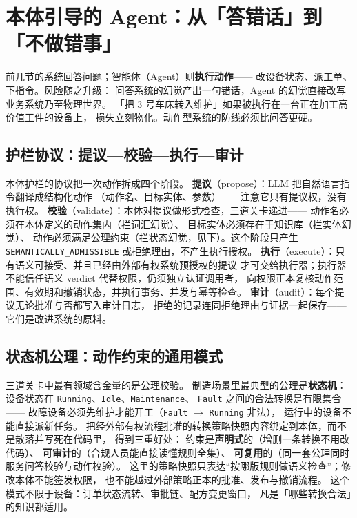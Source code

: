 \section{本体引导的 Agent：从「答错话」到「不做错事」}

前几节的系统回答问题；智能体（Agent）则\textbf{执行动作}——
改设备状态、派工单、下指令。风险随之升级：
问答系统的幻觉产出一句错话，Agent 的幻觉直接改写业务系统乃至物理世界。
「把 3 号车床转入维护」如果被执行在一台正在加工高价值工件的设备上，
损失立刻物化。动作型系统的防线必须比问答更硬。

\subsection{护栏协议：提议—校验—执行—审计}

本体护栏的协议把一次动作拆成四个阶段。
\textbf{提议}（propose）：LLM 把自然语言指令翻译成结构化动作
（动作名、目标实体、参数）——注意它只有提议权，没有执行权。
\textbf{校验}（validate）：本体对提议做形式检查，三道关卡递进——
动作名必须在本体定义的动作集内（拦词汇幻觉）、
目标实体必须存在于知识库（拦实体幻觉）、
动作必须满足公理约束（拦状态幻觉，见下）。这个阶段只产生
\texttt{SEMANTICALLY\_ADMISSIBLE} 或拒绝理由，不产生执行授权。
\textbf{执行}（execute）：只有语义可接受、并且已经由外部有权系统预授权的提议
才可交给执行器；执行器不能信任语义 verdict 代替权限，仍须独立认证调用者，
向权限正本复核动作范围、有效期和撤销状态，并执行事务、并发与幂等检查。
\textbf{审计}（audit）：每个提议无论批准与否都写入审计日志，
拒绝的记录连同拒绝理由与证据一起保存——它们是改进系统的原料。

\subsection{状态机公理：动作约束的通用模式}

三道关卡中最有领域含金量的是公理校验。
制造场景里最典型的公理是\textbf{状态机}：
设备状态在 \texttt{Running}、\texttt{Idle}、\texttt{Maintenance}、
\texttt{Fault} 之间的合法转换是有限集合——
故障设备必须先维护才能开工（\texttt{Fault} \(\rightarrow\) \texttt{Running} 非法），
运行中的设备不能直接派新任务。
把经外部有权流程批准的转换策略快照内容绑定到本体，而不是散落并写死在代码里，
得到三重好处：
约束是\textbf{声明式}的（增删一条转换不用改代码）、
\textbf{可审计}的（合规人员能直接读懂规则全集）、
\textbf{可复用}的（同一套公理同时服务问答校验与动作校验）。
这里的策略快照只表达“按哪版规则做语义检查”；修改本体不能签发权限，
也不能越过外部策略正本的批准、发布与撤销流程。
这个模式不限于设备：订单状态流转、审批链、配方变更窗口，
凡是「哪些转换合法」的知识都适用。

